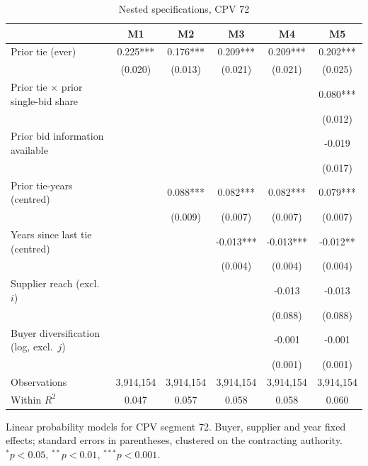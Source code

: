 \begin{table}[htbp]
\centering
\begin{threeparttable}
\caption{Nested specifications, CPV 72}
\label{tab:panel-nested-72}
\begin{tabular}{lccccc}
\toprule
 & M1 & M2 & M3 & M4 & M5 \\
\midrule
Prior tie (ever) & 0.225*** & 0.176*** & 0.209*** & 0.209*** & 0.202*** \\
 & (0.020) & (0.013) & (0.021) & (0.021) & (0.025) \\
Prior tie $\times$ prior single-bid share &  &  &  &  & 0.080*** \\
 &  &  &  &  & (0.012) \\
Prior bid information available &  &  &  &  & -0.019 \\
 &  &  &  &  & (0.017) \\
Prior tie-years (centred) &  & 0.088*** & 0.082*** & 0.082*** & 0.079*** \\
 &  & (0.009) & (0.007) & (0.007) & (0.007) \\
Years since last tie (centred) &  &  & -0.013*** & -0.013*** & -0.012** \\
 &  &  & (0.004) & (0.004) & (0.004) \\
Supplier reach (excl.\ $i$) &  &  &  & -0.013 & -0.013 \\
 &  &  &  & (0.088) & (0.088) \\
Buyer diversification (log, excl.\ $j$) &  &  &  & -0.001 & -0.001 \\
 &  &  &  & (0.001) & (0.001) \\
\midrule
Observations & 3,914,154 & 3,914,154 & 3,914,154 & 3,914,154 & 3,914,154 \\
Within $R^2$ & 0.047 & 0.057 & 0.058 & 0.058 & 0.060 \\
\bottomrule
\end{tabular}
\begin{tablenotes}\small\item Linear probability models for CPV segment 72. Buyer, supplier and year fixed effects; standard errors in parentheses, clustered on the contracting authority. $^{*}p<0.05$, $^{**}p<0.01$, $^{***}p<0.001$.\end{tablenotes}
\end{threeparttable}
\end{table}